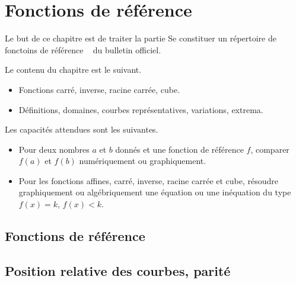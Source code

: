 
\chapter{Fonctions de référence}

Le but de ce chapitre est de traiter la partie \og Se constituer un répertoire de fonctoins de référence \fg~ du bulletin officiel.

Le contenu du chapitre est le suivant.
	\begin{itemize}
		\item Fonctions carré, inverse, racine carrée, cube.
		\item Définitions, domaines, courbes représentatives, variations, extrema.
	\end{itemize}

Les capacités attendues sont les suivantes.
	\begin{itemize}
		\item Pour deux nombres $a$ et $b$ donnés et une fonction de référence $f$, comparer $f(a)$ et $f(b)$ numériquement ou graphiquement.
		\item Pour les fonctions affines, carré, inverse, racine carrée et cube, résoudre graphiquement ou algébriquement une équation ou une inéquation du type $f(x) = k$, $f(x) < k$.
	\end{itemize}

\section{Fonctions de référence}

\section{Position relative des courbes, parité}